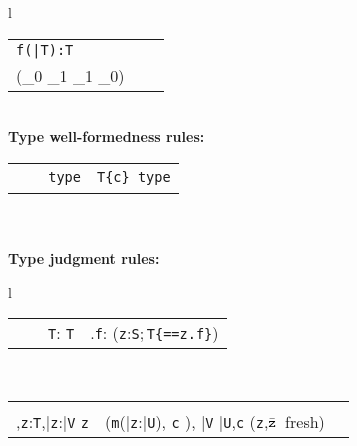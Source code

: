 \begin{figure*}
\begin{tabular}{l}
{\begin{tabular}{p{}p{}p{}}
        {\Gamma\tt \vdash \tt f(\bar{\tt T}):T}
&
\infrule[Equals]
        {\Gamma \vdash {\tt t}_0: {\tt T}_0
        \andalso
        \Gamma \vdash {\tt t}_1: {\tt T}_1 \\
          (\Gamma \vdash {\tt T}_0 \subtype {\tt T}_1 \vee
          \Gamma \vdash {\tt T}_1 \subtype {\tt T}_0)}
        {\Gamma \vdash {\tt t}_0{\tt ==}{\tt t}_1:o}
\\
\end{tabular}}
\quad\\
{\bf Type well-formedness rules:}\\[-12pt]
{\tabcolsep=0pt
\begin{tabular}{p{}p{}p{}}
\infrule[Class]
	{\Gamma \vdash \klass({\tt C})}
	{\Gamma \vdash {\tt C}\ \type} 
&
\infrule[Exists-T]
	{\Gamma\tt \vdash {\tt S}\ \type, {\tt T}\ \type}
	{\Gamma\tt \vdash {\tt x:S;T}\ {\tt type}} 
&
\infrule[Dep]
	{\Gamma\tt \vdash T\ \type \andalso \Gamma, \self:T \vdash c:o}
	{\Gamma\tt \vdash T\{c\}\ {\tt type}} 
\\
\end{tabular}}
\quad\\
\quad\\
{\bf Type judgment rules:}\\[-12pt]
{\tabcolsep=0pt
\begin{tabular}{l}
\begin{tabular}{p{}p{}p{}}
\infax[T-Var]
      {\Gamma, {\tt x}:{\tt T} \vdash {\tt x}:{\tt T\{\self==x\}}}
&
\infrule[T-Cast]
	{\Gamma \vdash {\tt e}:{\tt U} \andalso \Gamma \vdash {\tt T} \ \type}
	{\Gamma \vdash {\tt e}\ \as\ {\tt T}: {\tt T}} &
\infrule[T-Field]
	{\Gamma \vdash {\tt e}: {\tt S} \andalso \Gamma,{\tt z}:{\tt S}\vdash {\tt z}\ \has\ {\tt f}:{\tt T} \andalso \mbox{({\tt z} fresh)} }
	{\Gamma \vdash {\tt e}.{\tt f}:  ({\tt z}:{\tt S};\,{\tt T\{\self==z.f\}})}
\end{tabular}\\[-12pt]
\begin{tabular}{p{}p{}} 
\infrule[T-Invk]
	{\Gamma \vdash {\tt e}:{\tt T},\bar{\tt e}:\bar{\tt V} \andalso \\
	  \Gamma,{\tt z}:{\tt T},\bar{\tt z}:\bar{\tt V} \vdash
		{\tt z}\ \has\ ({\tt m}(\bar{\tt z}:\bar{\tt U}), {\tt c} \rightarrow {\tt S}), 
		\bar{\tt V} \subtype \bar{\tt U},{\tt c} 
	  \andalso \mbox{({\tt z},$\bar{\tt z}$ fresh)}}
	{\Gamma \vdash {\tt e}.{\tt m}(\bar{\tt e}):
}
\end{tabular}
\end{tabular}}
\end{tabular}
\end{figure*}
